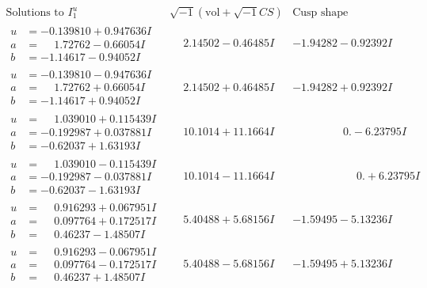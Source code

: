 \documentclass[1p]{elsarticle_modified}
\theoremstyle{definition}
\newcommand{\I}{\sqrt{-1}}
\begin{document}
$$\begin{array}{c|c|c}  
\text{Solutions to }I^u_{1}& \I (\text{vol} + \sqrt{-1}CS) & \text{Cusp shape}\\
 \hline 
\begin{aligned}
u &= -0.139810 + 0.947636 I \\
a &= \phantom{-}1.72762 - 0.66054 I \\
b &= -1.14617 - 0.94052 I\end{aligned}
 & \phantom{-}2.14502 - 0.46485 I & -1.94282 - 0.92392 I \\ \hline\begin{aligned}
u &= -0.139810 - 0.947636 I \\
a &= \phantom{-}1.72762 + 0.66054 I \\
b &= -1.14617 + 0.94052 I\end{aligned}
 & \phantom{-}2.14502 + 0.46485 I & -1.94282 + 0.92392 I \\ \hline\begin{aligned}
u &= \phantom{-}1.039010 + 0.115439 I \\
a &= -0.192987 + 0.037881 I \\
b &= -0.62037 + 1.63193 I\end{aligned}
 & \phantom{-}10.1014 + 11.1664 I & \phantom{-0.000000 } 0. - 6.23795 I \\ \hline\begin{aligned}
u &= \phantom{-}1.039010 - 0.115439 I \\
a &= -0.192987 - 0.037881 I \\
b &= -0.62037 - 1.63193 I\end{aligned}
 & \phantom{-}10.1014 - 11.1664 I & \phantom{-0.000000 -}0. + 6.23795 I \\ \hline\begin{aligned}
u &= \phantom{-}0.916293 + 0.067951 I \\
a &= \phantom{-}0.097764 + 0.172517 I \\
b &= \phantom{-}0.46237 - 1.48507 I\end{aligned}
 & \phantom{-}5.40488 + 5.68156 I & -1.59495 - 5.13236 I \\ \hline\begin{aligned}
u &= \phantom{-}0.916293 - 0.067951 I \\
a &= \phantom{-}0.097764 - 0.172517 I \\
b &= \phantom{-}0.46237 + 1.48507 I\end{aligned}
 & \phantom{-}5.40488 - 5.68156 I & -1.59495 + 5.13236 I \\ \hline\begin{aligned}

\end{aligned}
\end{array}$$
\end{document}
